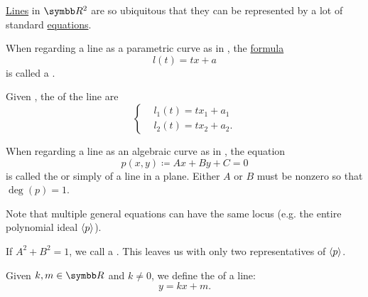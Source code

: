 \begin{definition}\label{def:plane_line_equations}
  \hyperref[def:geometric_line]{Lines} in \( \BR^2 \) are so ubiquitous that they can be represented by a lot of standard \hyperref[ex:equations]{equations}.

  \begin{DefEnum}
     When regarding a line as a parametric curve as in , the \hyperref[def:first_order_syntax/formula]{formula}
    \begin{equation}\label{def:plane_line_equations/parametric_equation}
      l(t) = tx + a
    \end{equation}
    is called a .

     Given , the  of the line are
    \begin{equation}\label{def:plane_line_equations/scalar_parametric_equations}
      \begin{cases}
         & l_1(t) = t x_1 + a_1  \\
         & l_2(t) = t x_2 + a_2.
      \end{cases}
    \end{equation}

     When regarding a line as an algebraic curve as in , the equation
    \begin{equation}\label{def:plane_line_equations/general_equation}
      p(x, y) \coloneqq Ax + By + C = 0
    \end{equation}
    is called the  or simply  of a line in a plane. Either \( A \) or \( B \) must be nonzero so that \( \deg(p) = 1 \).

    Note that multiple general equations can have the same locus (e.g. the entire polynomial ideal \( \Braket{p} \)).

     If \( A^2 + B^2 = 1 \), we call  a . This leaves us with only two representatives of \( \Braket{p} \).

     Given \( k, m \in \BR \) and  \( k \neq 0 \), we define the  of a line:
    \begin{equation}\label{def:plane_line_equations/cartesian_equation}
      y = kx + m.
    \end{equation}


\end{DefEnum}
\end{definition}
